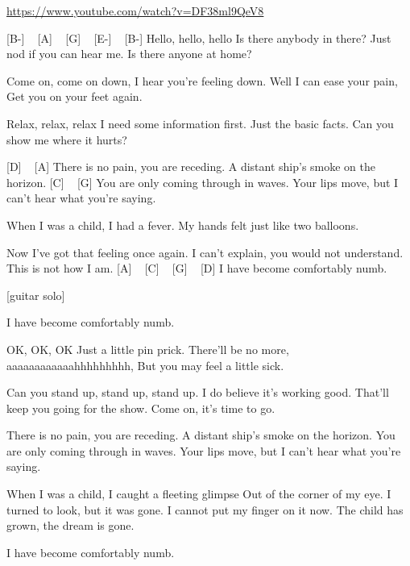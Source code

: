
\url{https://www.youtube.com/watch?v=DF38ml9QeV8}

[B-] ~ [A] ~ [G] ~ [E-] ~ [B-]
Hello, hello, hello
Is there anybody in there?
Just nod if you can hear me.
Is there anyone at home?


Come on, come on down,
I hear you're feeling down.
Well I can ease your pain,
Get you on your feet again.

Relax, relax, relax
I need some information first.
Just the basic facts.
Can you show me where it hurts?

[D] ~ [A] 
There is no pain, you are receding.
A distant ship's smoke on the horizon.
[C] ~ [G] 
You are only coming through in waves.
Your lips move, but I can't hear what you're saying.

When I was a child, I had a fever.
My hands felt just like two balloons.

Now I've got that feeling once again.
I can't explain, you would not understand.
This is not how I am.
[A] ~ [C] ~ [G] ~ [D]
I have become comfortably numb.

[guitar solo]

I have become comfortably numb.

OK, OK, OK
Just a little pin prick.
There'll be no more, aaaaaaaaaaaahhhhhhhhh,
But you may feel a little sick.

Can you stand up, stand up, stand up.
I do believe it's working good.
That'll keep you going for the show.
Come on, it's time to go.

There is no pain, you are receding.
A distant ship's smoke on the horizon.
You are only coming through in waves.
Your lips move, but I can't hear what you're saying.

When I was a child, I caught a fleeting glimpse
Out of the corner of my eye.
I turned to look, but it was gone.
I cannot put my finger on it now.
The child has grown, the dream is gone.

I have become comfortably numb. 